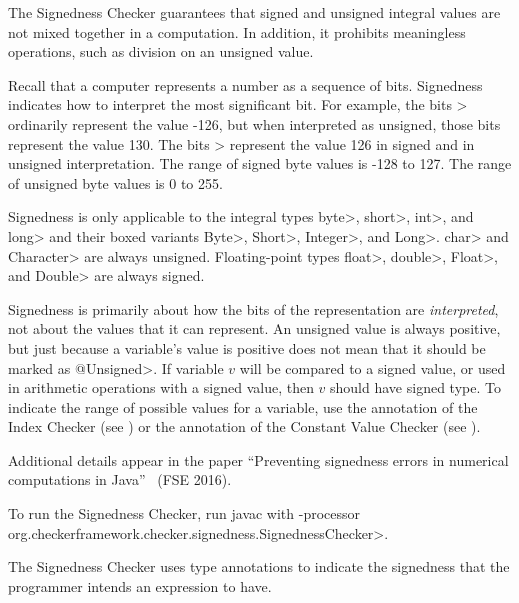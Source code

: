 \htmlhr
{}

The Signedness Checker guarantees that signed and unsigned integral values are not mixed
together in a computation. In addition, it prohibits meaningless operations, such
as division on an unsigned value.

Recall that a computer represents a number as a sequence of bits.
Signedness indicates how to interpret the most significant bit.  For
example, the bits > ordinarily represent the value -126, but when
interpreted as unsigned, those bits represent the value 130.  The bits
> represent the value 126 in signed and in unsigned interpretation.
The range of signed byte values is -128 to 127.  The range of unsigned byte
values is 0 to 255.

Signedness is only applicable to the integral types \<byte>,
\<short>, \<int>, and \<long> and their boxed variants \<Byte>,
\<Short>, \<Integer>, and \<Long>.
\<char> and \<Character> are always unsigned.
Floating-point types \<float>, \<double>, \<Float>, and \<Double> are always signed.

Signedness is primarily about how the bits of the representation are
\emph{interpreted}, not about the values that it can represent.  An unsigned value
is always positive, but just because a variable's value is positive does
not mean that it should be marked as \<@Unsigned>.  If variable $v$ will be
compared to a signed value, or used in arithmetic operations with a signed
value, then $v$ should have signed type.
To indicate the range of possible values for a variable, use the
 annotation of the Index
Checker (see ) or the
 annotation of the Constant Value
Checker (see ).

Additional details appear in the paper
``Preventing signedness errors in numerical computations in
Java''~\cite{Mackie2016} (FSE 2016).

To run the Signedness Checker, run javac with
\<-processor org.checkerframework.checker.signedness.SignednessChecker>.



The Signedness Checker uses type annotations to indicate the signedness that the programmer intends an expression to have.

